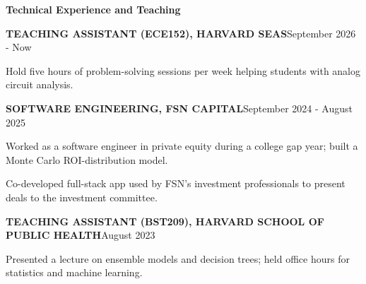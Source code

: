 \documentclass{article}
\newcommand{\eleven}{\fontsize{11bp}{12.66bp}\selectfont}
\newcommand{\twelve}{\fontsize{12bp}{13.76bp}\selectfont}
\renewcommand{\section}[1]{\par{\twelve\centering\textbf{#1}\par}}
\newcommand{\entry}[3][0bp]{\par{\eleven\textbf{#2}\hfill#3\hspace*{#1}\par}}
\begin{document}
\section{Technical Experience and Teaching}
\entry{TEACHING ASSISTANT (ECE152), HARVARD SEAS}{September 2026 - Now}
\begin{bullets}
\item {\eleven Hold five hours of problem-solving sessions per week helping students with analog circuit analysis.\par}
\end{bullets}
\entry{SOFTWARE ENGINEERING, FSN CAPITAL}{September 2024 - August 2025}
\begin{bullets}
\item {\eleven Worked as a software engineer in private equity during a college gap year; built a Monte Carlo ROI-distribution model.\par}
\item {\eleven Co-developed full-stack app used by FSN's investment professionals to present deals to the investment committee.\par}
\end{bullets}
\entry{TEACHING ASSISTANT (BST209), HARVARD SCHOOL OF PUBLIC HEALTH}{August 2023}
\begin{bullets}
\item {\eleven Presented a lecture on ensemble models and decision trees; held office hours for statistics and machine learning.\par}
\end{bullets}
\end{document}
